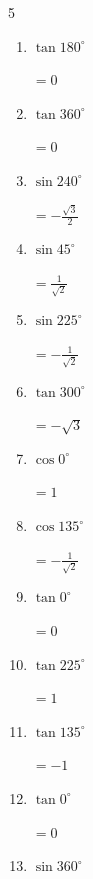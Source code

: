 \begin{multicols}{5}
\begin{enumerate}
        $\displaystyle =-\frac{1}{\sqrt{2}}$

\columnbreak %

\resetques

  \item $\displaystyle \tan{180^\circ}$

        $\displaystyle =0$

  \item $\displaystyle \tan{360^\circ}$

        $\displaystyle =0$

  \item $\displaystyle \sin{240^\circ}$

        $\displaystyle =-\frac{\sqrt{3}}{2}$

  \item $\displaystyle \sin{45^\circ}$

        $\displaystyle =\frac{1}{\sqrt{2}}$

  \item $\displaystyle \sin{225^\circ}$

        $\displaystyle =-\frac{1}{\sqrt{2}}$

  \item $\displaystyle \tan{300^\circ}$

        $\displaystyle =-\sqrt{3}$

  \item $\displaystyle \cos{0^\circ}$

        $\displaystyle =1$

  \item $\displaystyle \cos{135^\circ}$

        $\displaystyle =-\frac{1}{\sqrt{2}}$

  \item $\displaystyle \tan{0^\circ}$

        $\displaystyle =0$

  \item $\displaystyle \tan{225^\circ}$

        $\displaystyle =1$

  \item $\displaystyle \tan{135^\circ}$

        $\displaystyle =-1$

  \item $\displaystyle \tan{0^\circ}$

        $\displaystyle =0$

  \item $\displaystyle \sin{360^\circ}$


\end{enumerate}
\end{multicols}
